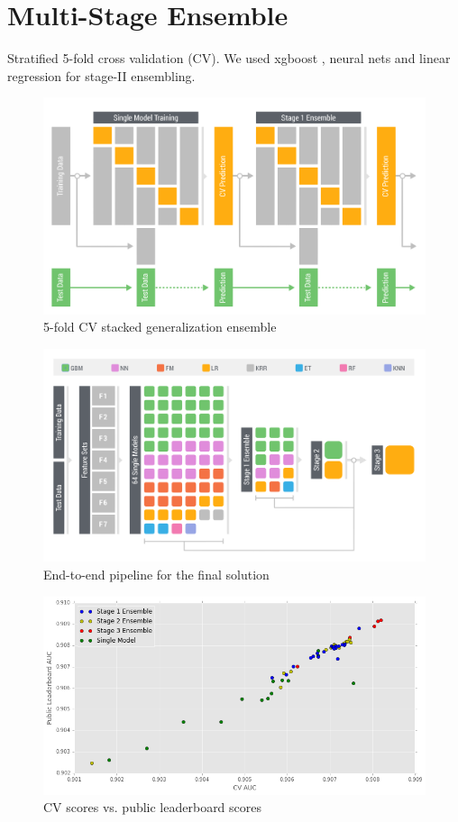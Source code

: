 \section{Multi-Stage Ensemble}
Stratified 5-fold cross validation (CV).
We used xgboost \cite{xgboost}, neural nets and linear regression for stage-II ensembling.

\begin{figure}[!ht]
  \caption{5-fold CV stacked generalization ensemble}
  \centering
    \includegraphics[width=0.5 \textwidth]{cv_ensemble}
\end{figure}

\begin{figure}[!ht]
  \caption{End-to-end pipeline for the final solution}
  \centering
    \includegraphics[width=1 \textwidth]{ensemble}
\end{figure}

\begin{figure}[!ht]
  \caption{CV scores vs. public leaderboard scores}
  \centering
    \includegraphics[width=1 \textwidth]{cv_lb}
\end{figure}

